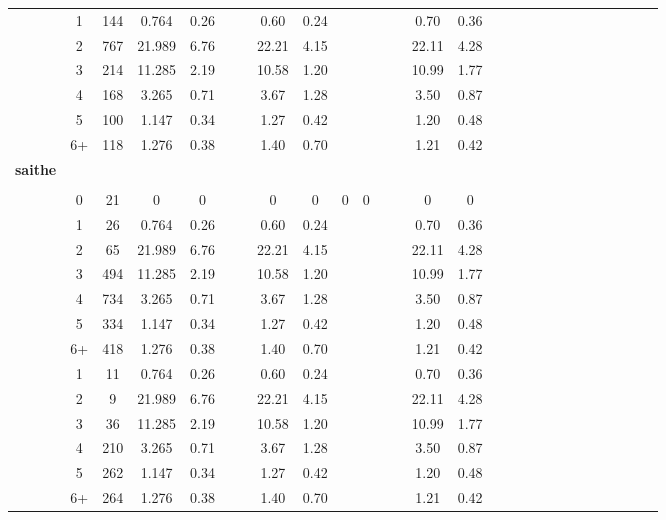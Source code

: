\documentclass[a4paper 12pt]{article}
\numberwithin{equation}{section}
\begin{document}
\begin{tiny}
\begin{table}[h!]
\begin{tabular}{ccccccccccccccccccccccccccc}
\raisebox{1.5ex}{2018 Q1} & 1 & 144 & 0.764  & 0.26  & & &  0.60  & 0.24  & & & & &0.70 & 0.36  \\[1ex]
& 2 & 767 & 21.989 & 6.76  & & & 22.21 & 4.15  & & & &  & 22.11& 4.28  \\[1ex]
& 3 & 214 & 11.285 & 2.19  & & & 10.58 & 1.20  & & & &  & 10.99& 1.77  \\[1ex]
& 4 & 168 & 3.265  & 0.71  & & & 3.67  & 1.28  & & & &  & 3.50 & 0.87 \\[1ex]
& 5 & 100 & 1.147  & 0.34  & & & 1.27  & 0.42  & & & &  & 1.20 & 0.48  \\[1ex]
& 6+ & 118  & 1.276 & 0.38  & & & 1.40  & 0.70  & & & & & 1.21 & 0.42 \\[3.5ex]

{\bf saithe} \\[1.0ex]
\cmidrule(lr{0.5em}){1-1} \\
\raisebox{1.5ex}{ 2017 Q3} & 0  & 21 & 0  & 0  &  &  &  0 & 0 &0  & 0 &  & & 0 & 0 &  \\[1ex]
& 1  & 26 & 0.764  & 0.26 & & & 0.60  & 0.24  & & & & &0.70 & 0.36  \\[1ex]
& 2  & 65  & 21.989 & 6.76  & & &  22.21 & 4.15 & & & & & 22.11& 4.28  \\[1ex]
& 3  & 494  & 11.285 & 2.19  & & & 10.58  & 1.20 & & & & & 10.99& 1.77  \\[1ex]
& 4  & 734 & 3.265  & 0.71  & & & 3.67   & 1.28 & & & & & 3.50 & 0.87  \\[1ex]
& 5  & 334 & 1.147  & 0.34  & & & 1.27   & 0.42 & & & & & 1.20 & 0.48  \\[1ex]
& 6+ & 418 & 1.276  & 0.38  & & & 1.40   & 0.70 & & & & & 1.21 & 0.42 \\[3.5ex]

\raisebox{1.5ex}{2018 Q1} & 1  & 11 & 0.764  & 0.26 & & & 0.60  & 0.24  & & & & &0.70 & 0.36  \\[1ex]
& 2  & 9  & 21.989 & 6.76  & & &  22.21 & 4.15 & & & & & 22.11& 4.28  \\[1ex]
& 3  & 36  & 11.285 & 2.19  & & & 10.58  & 1.20 & & & & & 10.99& 1.77  \\[1ex]
& 4  & 210 & 3.265  & 0.71  & & & 3.67   & 1.28 & & & & & 3.50 & 0.87  \\[1ex]
& 5  & 262 & 1.147  & 0.34  & & & 1.27   & 0.42 & & & & & 1.20 & 0.48  \\[1ex]
& 6+ & 264 & 1.276  & 0.38  & & & 1.40   & 0.70 & & & & & 1.21 & 0.42 \\[0.5ex]


\hline
\end{tabular}
\end{table}
\end{tiny}
\end{document}
